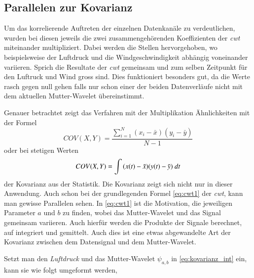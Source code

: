 \begin{refsection}
\subsection{Parallelen zur Kovarianz}
Um das korrelierende Auftreten der einzelnen Datenkanäle zu verdeutlichen, wurden bei diesen jeweils die zwei zusammengehörenden Koeffizienten der \textit{cwt} miteinander multipliziert. 
Dabei werden die Stellen hervorgehoben, wo beispielsweise der Luftdruck und die Windgeschwindigkeit abhängig voneinander variieren. 
Sprich die Resultate der \textit{cwt} gemeinsam und zum selben Zeitpunkt für den Luftruck und Wind gross sind.
Dies funktioniert besonders gut, da die Werte rasch gegen null gehen falls nur schon einer der beiden Datenverläufe nicht mit dem aktuellen Mutter-Wavelet übereinstimmt.


Genauer betrachtet zeigt das Verfahren mit der Multiplikation Ähnlichkeiten mit der Formel
\begin{equation}
COV(X,Y) = \frac{\sum_{i=1}^{N} (x_i- \bar{x})(y_i- \bar{y})}{N-1}
\label{eq:kovarianz}
\end{equation}
oder bei stetigen Werten
\begin{equation}
COV(X,Y) = \int{(x(t)- \bar{x})(y(t)- \bar{y}) \text{\space}dt}
\label{eq:kovarianz_int}
\end{equation}
der Kovarianz aus der Statistik. 
Die Kovarianz zeigt sich nicht nur in dieser Anwendung. Auch schon bei der grundlegenden Formel \eqref{eq:cwt1} der \textit{cwt}, kann man gewisse Parallelen sehen. 
In \eqref{eq:cwt1} ist die Motivation, die jeweiligen Parameter $a$ und $b$ zu finden, wobei das Mutter-Wavelet und das Signal gemeinsam variieren.
Auch hierfür werden die Produkte der Signale berechnet, auf integriert und gemittelt.
Auch dies ist eine etwas abgewandelte Art der Kovarianz zwischen dem Datensignal und dem Mutter-Wavelet.

Setzt man den \textit{Luftdruck} und das Mutter-Wavelet $\psi_{a,b}$ in \eqref{eq:kovarianz_int} ein, kann sie wie folgt umgeformt werden,


\end{refsection}
